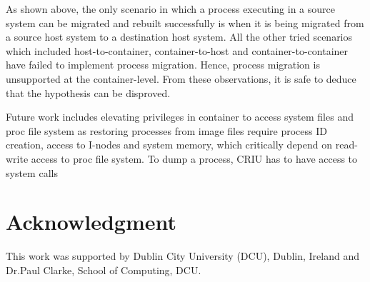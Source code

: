 \documentclass[conference]{IEEEtran}
\begin{document}
As shown above, the only scenario in which a process executing in a source system can be migrated and rebuilt successfully is when it is being migrated from a source host system to a destination host system. All the other tried scenarios which included host-to-container, container-to-host and container-to-container have failed to implement process migration. Hence, process migration is unsupported at the container-level. From these observations, it is safe to deduce that the hypothesis can be disproved. 

Future work includes elevating privileges in container to access system files and proc file system as restoring processes from image files require process ID creation, access to I-nodes and system memory, which critically depend on read-write access to proc file system. To dump a process, CRIU has to have access to  system calls



\section*{Acknowledgment}
This work was supported by Dublin City University (DCU), Dublin, Ireland and Dr.Paul Clarke, School of Computing, DCU.




\end{document}
